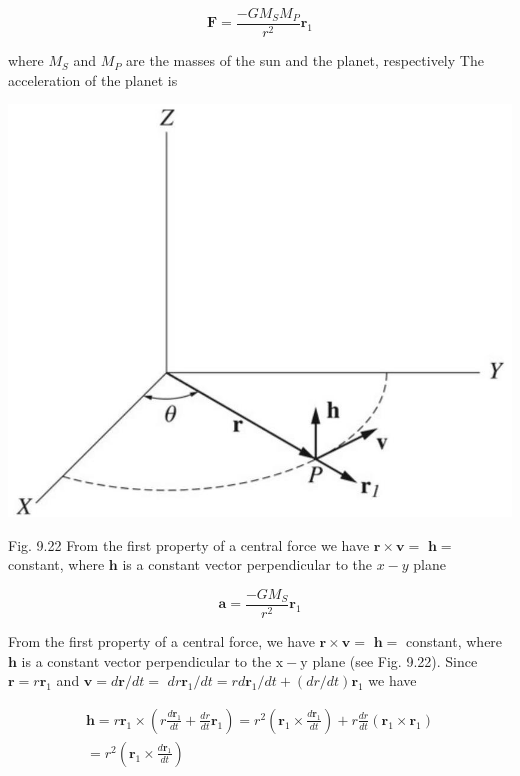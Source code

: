 \documentclass[10pt]{article}
\begin{document}
$$
\mathbf{F}=\frac{-G M_{S} M_{P}}{r^{2}} \mathbf{r}_{1}
$$

where $M_{S}$ and $M_{P}$ are the masses of the sun and the planet, respectively The acceleration of the planet is

\begin{center}
\includegraphics[max width=\textwidth]{2024_09_13_db1f357d2aad0a03eb2eg-156}
\end{center}

Fig. 9.22 From the first property of a central force we have $\mathbf{r} \times \mathbf{v}=$ $\mathbf{h}=$ constant, where $\mathbf{h}$ is a constant vector perpendicular to the $x-y$ plane

$$
\mathbf{a}=\frac{-G M_{S}}{r^{2}} \mathbf{r}_{1}
$$

From the first property of a central force, we have $\mathbf{r} \times \mathbf{v}=$ $\mathbf{h}=$ constant, where $\mathbf{h}$ is a constant vector perpendicular to the $\mathrm{x}-\mathrm{y}$ plane (see Fig. 9.22). Since $\mathbf{r}=r \mathbf{r}_{1}$ and $\mathbf{v}=d \mathbf{r} / d t=$ $d r \mathbf{r}_{1} / d t=r d \mathbf{r}_{1} / d t+(d r / d t) \mathbf{r}_{1}$ we have

$$
\begin{gathered}
\mathbf{h}=r \mathbf{r}_{1} \times\left(r \frac{d \mathbf{r}_{1}}{d t}+\frac{d r}{d t} \mathbf{r}_{1}\right)=r^{2}\left(\mathbf{r}_{1} \times \frac{d \mathbf{r}_{1}}{d t}\right)+r \frac{d r}{d t}\left(\mathbf{r}_{1} \times \mathbf{r}_{1}\right) \\
=r^{2}\left(\mathbf{r}_{1} \times \frac{d \mathbf{r}_{1}}{d t}\right)
\end{gathered}
$$
\end{document}
